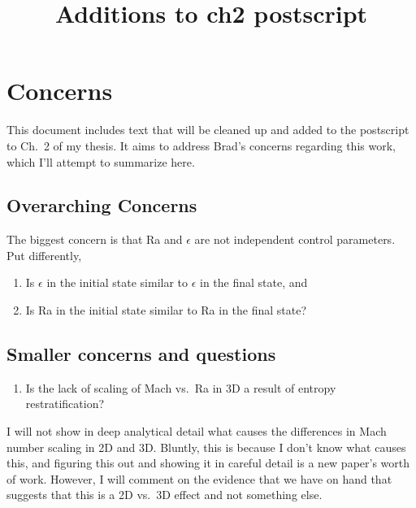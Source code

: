 \documentclass[aps, pre, onecolumn, nofootinbib, notitlepage, groupedaddress, amsfonts, amssymb, amsmath, longbibliography, superscriptaddress]{revtex4-1}
\begin{document}

\title{Additions to ch2 postscript}

\maketitle


\section{Concerns}
This document includes text that will be cleaned up and added to the postscript to Ch.~2 of my thesis.
It aims to address Brad's concerns regarding this work, which I'll attempt to summarize here.

\subsection{Overarching Concerns}
The biggest concern is that Ra and $\epsilon$ are not independent control parameters.
Put differently,
\begin{enumerate}
\item Is $\epsilon$ in the initial state similar to $\epsilon$ in the final state, and
\item Is Ra in the initial state similar to Ra in the final state?
\end{enumerate}

\subsection{Smaller concerns and questions}
\begin{enumerate}
\item Is the lack of scaling of Mach vs.~Ra in 3D a result of entropy restratification?
\end{enumerate}
I will not show in deep analytical detail what causes the differences in Mach number scaling in 2D and 3D.
Bluntly, this is because I don't know what causes this, and figuring this out and showing it in careful detail is a new paper's worth of work.
However, I will comment on the evidence that we have on hand that suggests that this is a 2D vs.~3D effect and not something else.
\end{document}
